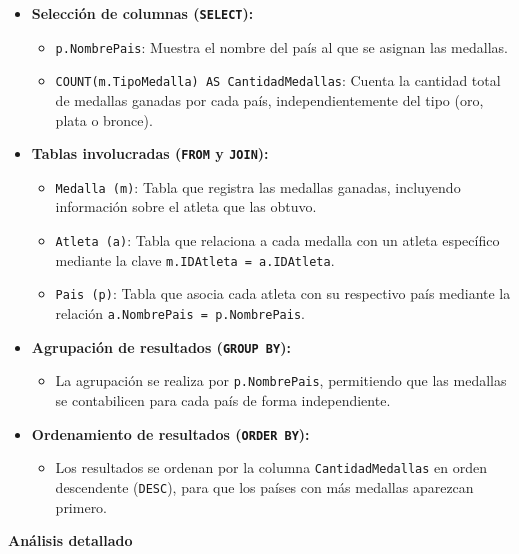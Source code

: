 \begin{itemize} \item \textbf{Selección de columnas (\texttt{SELECT}):} \begin{itemize} \item \texttt{p.NombrePais}: Muestra el nombre del país al que se asignan las medallas. \item \texttt{COUNT(m.TipoMedalla) AS CantidadMedallas}: Cuenta la cantidad total de medallas ganadas por cada país, independientemente del tipo (oro, plata o bronce). \end{itemize}
	
	\item \textbf{Tablas involucradas (\texttt{FROM} y \texttt{JOIN}):} \begin{itemize} \item \texttt{Medalla (m)}: Tabla que registra las medallas ganadas, incluyendo información sobre el atleta que las obtuvo. \item \texttt{Atleta (a)}: Tabla que relaciona a cada medalla con un atleta específico mediante la clave \texttt{m.IDAtleta = a.IDAtleta}. \item \texttt{Pais (p)}: Tabla que asocia cada atleta con su respectivo país mediante la relación \texttt{a.NombrePais = p.NombrePais}. \end{itemize}
	
	\item \textbf{Agrupación de resultados (\texttt{GROUP BY}):} \begin{itemize} \item La agrupación se realiza por \texttt{p.NombrePais}, permitiendo que las medallas se contabilicen para cada país de forma independiente. \end{itemize}
	
	\item \textbf{Ordenamiento de resultados (\texttt{ORDER BY}):} \begin{itemize} \item Los resultados se ordenan por la columna \texttt{CantidadMedallas} en orden descendente (\texttt{DESC}), para que los países con más medallas aparezcan primero. \end{itemize} \end{itemize}

\textbf{Análisis detallado}

